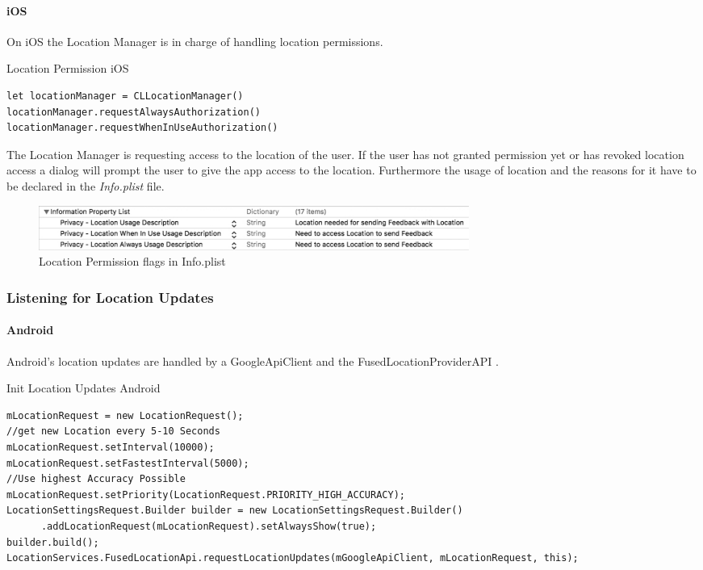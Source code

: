\paragraph{iOS}
On iOS the Location Manager is in charge of handling location permissions.
\begin{listing}[H]
  \caption{Location Permission iOS}
  \label{mint:loc_perm_ios}
  \begin{verbatim}
let locationManager = CLLocationManager()
locationManager.requestAlwaysAuthorization()
locationManager.requestWhenInUseAuthorization()
  \end{verbatim}
\end{listing}
The Location Manager is requesting access to the location of the user. If the user has not granted permission yet or has revoked location access a dialog will prompt the user to give the app access to the location.
Furthermore the usage of location and the reasons for it have to be declared in the \textit{Info.plist} file.

\begin{figure}[H]
\begin{center}
  \includegraphics[width=400pt]{bilder/info_plist_location_bw.pdf}
  \caption{Location Permission flags in Info.plist}\label{infoplist_loc_perm}
\end{center}
\end{figure}


\subsubsection{Listening for Location Updates}
\paragraph{Android}
Android's location updates are handled by a GoogleApiClient \cite{gAC} and the FusedLocationProviderAPI \cite{fla}.

\begin{listing}[H]
  \caption{Init Location Updates Android}
  \label{mint:loc_upd_and}
    \begin{verbatim}
mLocationRequest = new LocationRequest();
//get new Location every 5-10 Seconds
mLocationRequest.setInterval(10000);
mLocationRequest.setFastestInterval(5000);
//Use highest Accuracy Possible
mLocationRequest.setPriority(LocationRequest.PRIORITY_HIGH_ACCURACY);
LocationSettingsRequest.Builder builder = new LocationSettingsRequest.Builder()
      .addLocationRequest(mLocationRequest).setAlwaysShow(true);
builder.build();
LocationServices.FusedLocationApi.requestLocationUpdates(mGoogleApiClient, mLocationRequest, this);
    \end{verbatim}
\end{listing}

